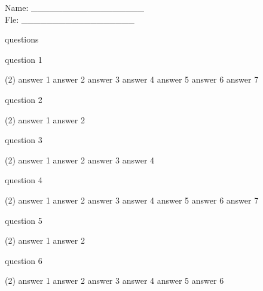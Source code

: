 \documentclass[a4paper,10pt]{article}
\begin{document}
\hfill Name: \_\_\_\_\_\_\_\_\_\_\_\_\_\_\_\_\_\_\\

\hfill Fle: \_\_\_\_\_\_\_\_\_\_\_\_\_\_\_\_\_\_\\

\begin{center}


\Huge questions\vspace{25pt}

\end{center}

\begin{question}
question 1
\begin{tasks}(2)
\task answer 1
\task answer 2
\task answer 3
\task answer 4
\task answer 5
\task answer 6
\task answer 7
\end{tasks}
\end{question}

\begin{question}
question 2
\begin{tasks}(2)
\task answer 1
\task answer 2
\end{tasks}
\end{question}

\begin{question}
question 3
\begin{tasks}(2)
\task answer 1
\task answer 2
\task answer 3
\task answer 4
\end{tasks}
\end{question}

\begin{question}
question 4
\begin{tasks}(2)
\task answer 1
\task answer 2
\task answer 3
\task answer 4
\task answer 5
\task answer 6
\task answer 7
\end{tasks}
\end{question}

\begin{question}
question 5
\begin{tasks}(2)
\task answer 1
\task answer 2
\end{tasks}
\end{question}

\begin{question}
question 6
\begin{tasks}(2)
\task answer 1
\task answer 2
\task answer 3
\task answer 4
\task answer 5
\task answer 6
\end{tasks}
\end{question}
\end{document}
